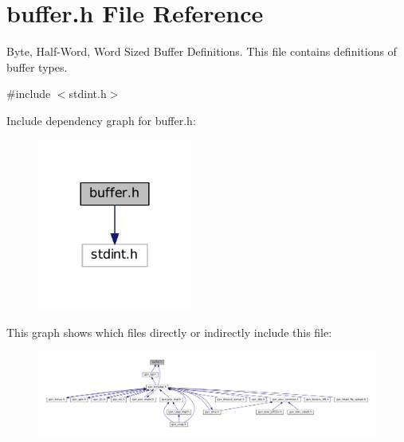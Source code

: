 \hypertarget{a00465}{
\section{buffer.h File Reference}
\label{a00465}
}


Byte, Half-\/Word, Word Sized Buffer Definitions. This file contains definitions of buffer types.  


{\ttfamily \#include $<$stdint.h$>$}\par
Include dependency graph for buffer.h:
\nopagebreak
\begin{figure}[H]
\begin{center}
\leavevmode
\includegraphics[width=144pt]{a00690}
\end{center}
\end{figure}
This graph shows which files directly or indirectly include this file:
\nopagebreak
\begin{figure}[H]
\begin{center}
\leavevmode
\includegraphics[width=400pt]{a00691}
\end{center}
\end{figure}
